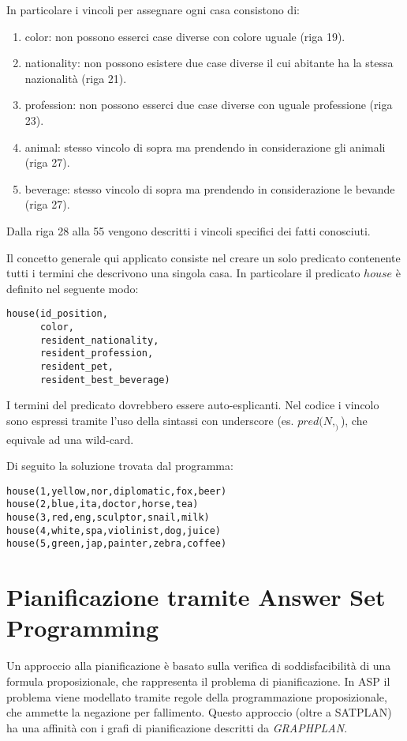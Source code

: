 In particolare i vincoli per assegnare ogni casa consistono di:

\begin{enumerate}
\item color: non possono esserci case diverse con colore uguale (riga 19).
\item nationality: non possono esistere due case diverse il cui abitante ha la stessa nazionalità (riga 21).
\item profession: non possono esserci due case diverse con uguale professione (riga 23).
\item animal: stesso vincolo di sopra ma prendendo in considerazione gli animali (riga 27).
\item beverage: stesso vincolo di sopra ma prendendo in considerazione le bevande (riga 27).
\end{enumerate}

Dalla riga 28 alla 55 vengono descritti i vincoli specifici dei fatti conosciuti.

Il concetto generale qui applicato consiste nel creare un solo predicato contenente tutti i termini che descrivono una singola casa. In particolare il predicato $house$ è definito nel seguente modo:

\begin{lstlisting}
house(id_position,
      color,
      resident_nationality,
      resident_profession,
      resident_pet,
      resident_best_beverage)
\end{lstlisting}

I termini del predicato dovrebbero essere auto-esplicanti. Nel codice i vincolo sono espressi tramite l'uso della sintassi con underscore (es. $pred(N,_)$), che equivale ad una wild-card.

Di seguito la soluzione trovata dal programma:
\begin{lstlisting}
house(1,yellow,nor,diplomatic,fox,beer)
house(2,blue,ita,doctor,horse,tea)
house(3,red,eng,sculptor,snail,milk)
house(4,white,spa,violinist,dog,juice)
house(5,green,jap,painter,zebra,coffee)
\end{lstlisting}

\section{Pianificazione tramite Answer Set Programming}

Un approccio alla pianificazione è basato sulla verifica di soddisfacibilità di una formula proposizionale, che rappresenta il problema di pianificazione.
In ASP il problema viene modellato tramite regole della programmazione proposizionale, che ammette la negazione per fallimento. Questo approccio (oltre a SATPLAN) ha una affinità con i grafi di pianificazione descritti da \emph{GRAPHPLAN}.

